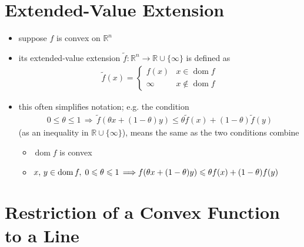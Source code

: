 \documentclass[11pt]{extarticle}
\newcommand{\ds}{\displaystyle}
\newcommand{\ie}{\,\Longrightarrow\,}
\DeclareMathOperator*{\dom}{dom}
\theoremstyle{definition}
\begin{document}
\newpage

\section*{Extended-Value Extension}
\begin{itemize}
  \item suppose $f$ is convex on $\mathbb{R}^n$
  \item its extended-value extension $\ds\widetilde{f}: \mathbb{R}^n\to\mathbb{R}\cup\{\infty\}$ is defined as
    \begin{align*}
      \widetilde{f}(x) = \begin{cases}f(x) & x\in\dom f \\ \infty & x\not\in\dom f\end{cases} 
    \end{align*}
  \item this often simplifies notation; e.g. the condition 
    \begin{align*}
      0\leqslant\theta\leqslant 1\ie\widetilde{f}(\theta x + (1 - \theta) y)\leqslant\theta\widetilde{f}(x) + (1 - \theta)\widetilde{f}(y)
    \end{align*}
    (as an inequality in $\mathbb{R}\cup\{\infty\}$), means the same as the two conditions combine
    \begin{itemize}
      \item $\dom f$ is convex
      \item $x,\,y\in\dom f,\;0\leqslant\theta\leqslant 1 \ie \\ f(\theta x + (1 - \theta)y)\leqslant\theta f(x) + (1 - \theta) f(y)$
    \end{itemize}
\end{itemize}

\newpage

\section*{Restriction of a Convex Function to a Line}
\end{document}
